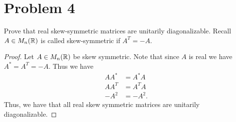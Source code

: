 \documentclass[12pt]{article}
\begin{document}
\section*{Problem 4}
Prove that real skew-symmetric matrices are unitarily diagonalizable. Recall $A\in M_n(\mathbb{R})$ is called skew-symmetric if $A^T=-A$.
\begin{proof}
    Let $A\in M_n(\mathbb{R})$ be skew symmetric. Note that since $A$ is real we have $A^\ast=A^T=-A$. Thus we have
    \begin{align*}
        AA^\ast&=A^\ast A\\
        AA^T&=A^TA\\
        -A^2&=-A^2.
    \end{align*}
    Thus, we have that all real skew symmetric matrices are unitarily diagonalizable.
\end{proof}
\end{document}
